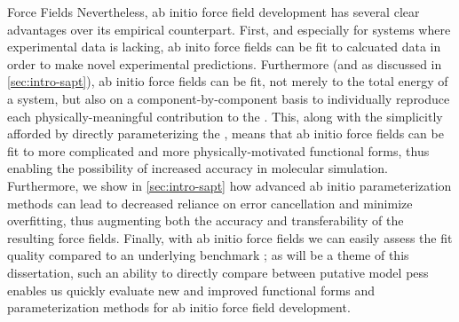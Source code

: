 \begin{section}{Force Fields}
Nevertheless, ab initio force field development has several clear advantages
over its empirical counterpart. 
First, and especially for systems where experimental data is lacking, ab inito
force fields can be fit to calcuated data in order to make novel experimental
predictions. Furthermore (and as discussed in \cref{sec:intro-sapt}), ab
initio force fields can be fit, not merely to the total energy of a system,
but also on a component-by-component basis to individually reproduce each
physically-meaningful contribution to the \pes. This, along with the
simplicitly afforded by directly parameterizing the \pes,
means that ab initio force fields can be fit to more complicated and more
physically-motivated functional
forms, thus enabling the possibility of increased accuracy in molecular
simulation. Furthermore, we show in \cref{sec:intro-sapt} how advanced
ab initio parameterization methods can lead to decreased reliance on error
cancellation and minimize overfitting, thus augmenting both the accuracy and
transferability of the resulting force fields. Finally, with ab initio force
fields we can easily assess the fit quality compared to an underlying
benchmark \pes; 
as will be a theme of this dissertation, such an ability to
directly compare between putative model \glspl{pes} enables us
quickly evaluate new and improved functional forms and parameterization
methods for ab initio force field development. 

\end{section}



